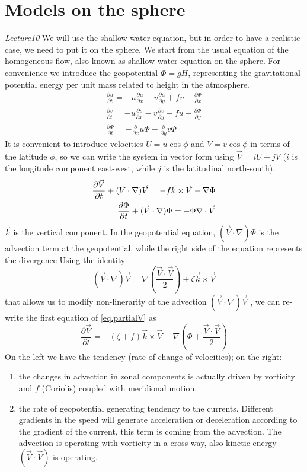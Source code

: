 \section{Models on the sphere} \textit{Lecture10}
We will use the shallow water equation, but in order to have a realistic case, we need to put it on the sphere. We start from the usual equation of the homogeneous flow, also known as shallow water equation on the sphere. For convenience we introduce the geopotential $\Phi= gH$, representing the gravitational potential energy per unit mass related to height in the atmosphere. 
\begin{align}
    \frac{\partial u}{\partial t}=-u\frac{\partial u}{\partial x}-v\frac{\partial u}{\partial y}+fv-\frac{\partial\Phi}{\partial x}\\
    \frac{\partial v}{\partial t}=-u\frac{\partial v}{\partial x}-v\frac{\partial v}{\partial y}-fu-\frac{\partial\Phi}{\partial y}\\
    \frac{\partial\Phi}{\partial t}=-\frac{\partial}{\partial x}u\Phi-\frac{\partial}{\partial y}v\Phi
\end{align}
It is convenient to introduce velocities $U=u\cos\phi$ and $V=v\cos\phi$ in terms of the latitude $\phi$, so we can write the system in vector form using $\vec{V}=iU+jV$ ($i$ is the longitude component east-west, while $j$ is the latitudinal north-south).
\begin{align}\label{eq.partialV}
    \frac{\partial\vec{V}}{\partial t}+(\vec{V}\cdot\nabla)\vec{V}=-f\vec{k}\times\vec{V}-\nabla\Phi \\
    \frac{\partial\Phi}{\partial t}+(\vec{V}\cdot\nabla)\Phi=-\Phi\nabla\cdot\vec{V}\notag
\end{align}
 $\vec{k}$ is the vertical component. In the geopotential equation, $(\vec{V}\cdot\nabla)\Phi$ is the advection term at the geopotential, while the right side of the equation represents the divergence
Using the identity
$$(\vec{V}\cdot\nabla)\vec{V}=\nabla\left(\frac{\vec{V}\cdot\vec{V}}{2}\right)+\zeta\vec{k}\times\vec{V}$$
that allows us to modify non-linerarity of the advection $(\vec{V}\cdot\nabla)\vec{V}$ , we can re-write the first equation of \ref{eq.partialV} as
\begin{equation}\label{eq.V}
    \frac{\partial\vec{V}}{\partial t}=-(\zeta+f)\vec{k}\times\vec{V}-\nabla\left(\Phi+\frac{\vec{V}\cdot\vec{V}}{2}\right)
\end{equation}
On the left we have the tendency (rate of change of velocities); on the right: 
\begin{enumerate}
    \item the changes in advection in zonal components is actually driven by vorticity and $f$ (Coriolis) coupled with meridional motion.
    \item the rate of geopotential generating tendency to the currents. Different gradients in the speed will generate acceleration or deceleration according to the gradient of the current, this term is coming from the advection. The advection is operating with vorticity in a cross way, also kinetic energy $(\vec{V}\cdot\vec{V})$ is operating.
\end{enumerate}



